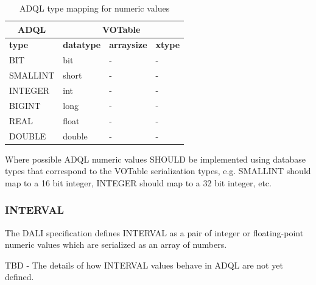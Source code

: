 \documentclass[11pt,a4paper]{ivoa}
\newcommand{\DALIspec}{DALI specification\xspace}
\begin{document}
\begin{table}[thm]\footnotesize
    \begin{tabular}
        {|p{}|p{}|p{}|p{}|}
        \hline

        \hline
        \multicolumn{1}{|c|}{\textbf{ADQL}} &
        \multicolumn{3}{|c|}{\textbf{VOTable}}
        \tabularnewline
        
        \hline
        \textbf{type} &
        \textbf{datatype} &
        \textbf{arraysize} &
        \textbf{xtype}
        \tabularnewline

        \hline
        BIT &
        bit &
        - &
        -
        \tabularnewline


        \hline
        SMALLINT &
        short &
        - &
        -
        \tabularnewline

        \hline
        INTEGER &
        int &
        - &
        -
        \tabularnewline

        \hline
        BIGINT &
        long &
        - &
        -
        \tabularnewline

        \hline
        REAL &
        float &
        - &
        -
        \tabularnewline

        \hline
        DOUBLE &
        double &
        - &
        -
        \tabularnewline

        \hline
    \end{tabular}
    \caption{ADQL type mapping for numeric values}
    \label{table:types.numeric.primitive}
\end{table}

Where possible ADQL numeric values SHOULD be implemented using database types
that correspond to the VOTable serialization types, e.g. SMALLINT should map to a
16 bit integer, INTEGER should map to a 32 bit integer, etc. 

\subsubsection{INTERVAL}
\label{sec:types.numeric.interval}

The \DALIspec defines INTERVAL as a pair of integer or floating-point
numeric values which are serialized as an array of numbers.

TBD - The details of how INTERVAL values behave in ADQL are not yet defined.
\end{document}
